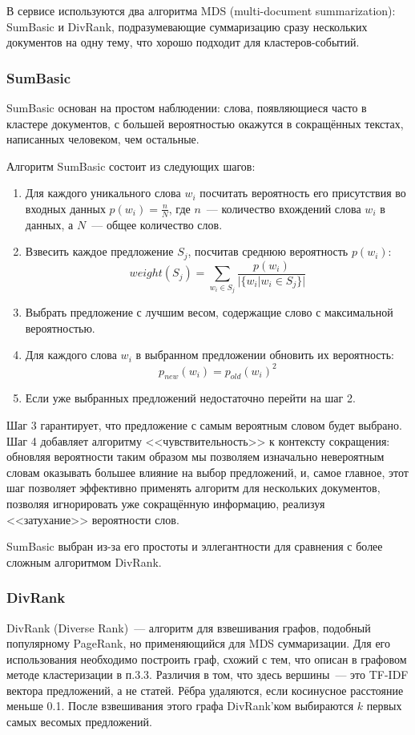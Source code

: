 \documentclass[a4paper, 14pt]{extarticle}
\begin{document}
В сервисе используются два алгоритма MDS (multi-document summarization): SumBasic и DivRank, подразумевающие суммаризацию сразу нескольких документов на одну тему, что хорошо подходит для кластеров-событий.
  
\subsubsection{SumBasic}
SumBasic основан на простом наблюдении: слова, появляющиеся часто в кластере документов, с большей вероятностью окажутся в сокращённых текстах, написанных человеком, чем остальные.

Алгоритм SumBasic состоит из следующих шагов:
\begin{enumerate}
	\item Для каждого уникального слова $w_i$ посчитать вероятность его присутствия во входных данных $p(w_i)=\frac{n}{N}$, где $n$~--- количество вхождений слова $w_i$ в данных, а $N$~--- общее количество слов.
	\item Взвесить каждое предложение $S_j$, посчитав среднюю вероятность $p(w_i)$:
	$$ weight(S_j) = \sum_{w_i\in S_j} \frac{p(w_i)}{|\{w_i|w_i\in S_j\}|}$$
	\item Выбрать предложение с лучшим весом, содержащие слово с максимальной вероятностью.
	\item Для каждого слова $w_i$ в выбранном предложении обновить их вероятность:
	$$p_{new}(w_i) = p_{old}(w_i)^2$$
	\item Если уже выбранных предложений недостаточно перейти на шаг 2. 
\end{enumerate} 

Шаг 3 гарантирует, что предложение с самым вероятным словом будет выбрано. Шаг 4 добавляет алгоритму <<чувствительность>> к контексту сокращения: обновляя вероятности таким образом мы позволяем изначально невероятным словам оказывать большее влияние на выбор предложений, и, самое главное, этот шаг позволяет эффективно применять алгоритм для нескольких документов, позволяя игнорировать уже сокращённую информацию, реализуя <<затухание>> вероятности слов.

SumBasic выбран из-за его простоты и эллегантности для сравнения с более сложным алгоритмом DivRank.
\subsubsection{DivRank}

DivRank (Diverse Rank)~--- алгоритм для взвешивания графов, подобный популярному PageRank, но применяющийся для MDS суммаризации. Для его использования необходимо построить граф, схожий с тем, что описан в графовом методе кластеризации в п.3.3. Различия в том, что здесь вершины~--- это TF-IDF вектора предложений, а не статей. Рёбра удаляются, если косинусное расстояние меньше 0.1. После взвешивания этого графа DivRank'ком выбираются $k$ первых самых весомых предложений.
\end{document}
